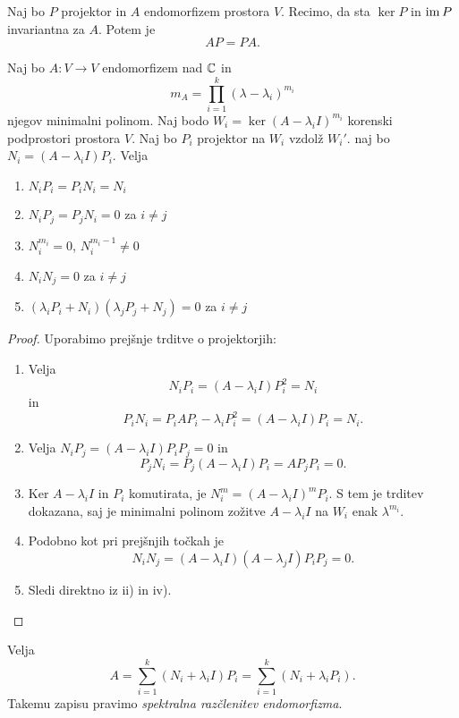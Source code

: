 \documentclass[12pt, a4paper]{article}
\begin{document}
\obvs

\begin{trditev}
Naj bo $P$ projektor in $A$ endomorfizem prostora $V$. Recimo, da sta $\ker P$ in $\operatorname{im} P$ invariantna za $A$. Potem je
\[
AP=PA.
\]
\end{trditev}

\obvs

\begin{trditev}
Naj bo $A\colon V\to V$ endomorfizem nad $\mathbb{C}$ in
\[
m_A=\prod_{i=1}^k(\lambda-\lambda_i)^{m_i}
\]
njegov minimalni polinom. Naj bodo $W_i=\ker(A-\lambda_iI)^{m_i}$ korenski podprostori prostora $V$. Naj bo $P_i$ projektor na $W_i$ vzdolž $W_i'$. naj bo $N_i=(A-\lambda_iI)P_i$. Velja

\begin{enumerate}[label=\roman*)]
\item $N_iP_i=P_iN_i=N_i$
\item $N_iP_j=P_jN_i=0$ za $i\ne j$
\item $N_i^{m_i}=0$, $N_i^{m_i-1}\ne 0$
\item $N_iN_j=0$ za $i\ne j$
\item $(\lambda_iP_i+N_i)(\lambda_jP_j+N_j)=0$ za $i\ne j$
\end{enumerate}
\end{trditev}

\begin{proof}
Uporabimo prejšnje trditve o projektorjih:

\begin{enumerate}[label=\roman*)]
\item Velja
\[
N_iP_i=(A-\lambda_iI)P_i^2=N_i
\]
in
\[
P_iN_i=P_iAP_i-\lambda_iP_i^2=(A-\lambda_iI)P_i=N_i.
\]
\item Velja $N_iP_j=(A-\lambda_iI)P_iP_j=0$ in
\[
P_jN_i=P_j(A-\lambda_iI)P_i=AP_jP_i=0.
\]
\item Ker $A-\lambda_iI$ in $P_i$ komutirata, je $N_i^{m}=(A-\lambda_iI)^{m}P_i$. S tem je trditev dokazana, saj je minimalni polinom zožitve $A-\lambda_iI$ na $W_i$ enak $\lambda^{m_i}$.
\item Podobno kot pri prejšnjih točkah je
\[
N_iN_j=(A-\lambda_iI)(A-\lambda_jI)P_iP_j=0.
\]
\item Sledi direktno iz ii) in iv).\qedhere
\end{enumerate}
\end{proof}

\begin{trditev}
Velja
\[
A=\sum_{i=1}^k (N_i+\lambda_iI)P_i=\sum_{i=1}^k\left(N_i+\lambda_iP_i\right).
\]
Takemu zapisu pravimo \emph{spektralna razčlenitev endomorfizma}.
\end{trditev}
\end{document}
